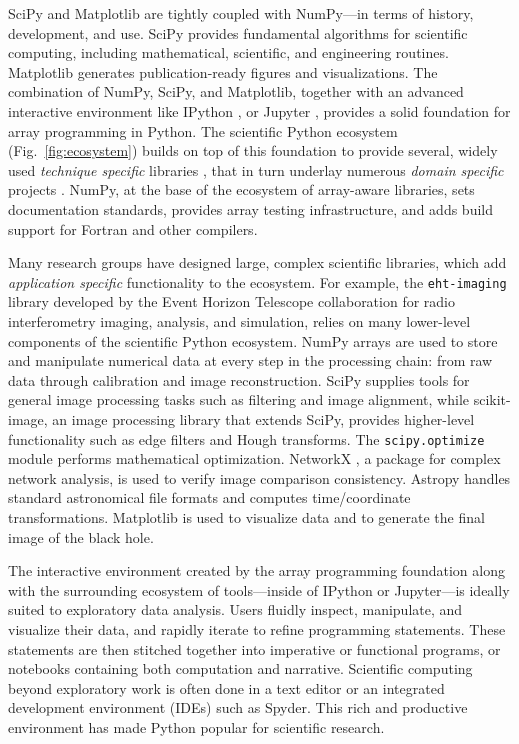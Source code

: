 \documentclass[twocolumn]{article}
\begin{document}
SciPy and Matplotlib are tightly coupled with NumPy---in terms of
history, development, and use.
SciPy provides fundamental algorithms for scientific computing,
including mathematical, scientific, and engineering routines.
Matplotlib generates publication-ready figures and visualizations.
The combination of NumPy, SciPy, and Matplotlib, together with
an advanced interactive environment like IPython \cite{perez2007ipython},
or Jupyter \cite{Kluyver:2016aa}, provides a solid foundation for array
programming in Python.
The scientific Python ecosystem (Fig.~\ref{fig:ecosystem}) builds on top of
this foundation to provide several, widely used \emph{technique specific}
libraries \cite{pedregosa2011scikit,vanderwalt2014scikit,SciPyProceedings_11},
that in turn underlay numerous \emph{domain specific} projects
\cite{astropy:2013,astropy:2018,cock2009biopython,millman2007analysis,sunpy2015,2018EGUGA..2012146H}.
NumPy, at the base of the ecosystem of array-aware libraries,
sets documentation standards, provides array testing infrastructure,
and adds build support for Fortran and other compilers.

Many research groups have designed large,
complex scientific libraries, which add \emph{application specific} functionality
to the ecosystem.
For example, the \texttt{eht-imaging} library \cite{chael2019ehtim} developed by
the Event Horizon Telescope collaboration for radio interferometry imaging,
analysis, and simulation, relies on many lower-level components of the scientific Python
ecosystem.
NumPy arrays are used to store and manipulate numerical data at every step
in the processing chain: from raw data through calibration and image
reconstruction.
SciPy supplies tools for general image processing tasks such as
filtering and image alignment, while scikit-image, an image processing
library that extends SciPy, provides higher-level functionality such as
edge filters and Hough transforms.
The \texttt{scipy.optimize} module performs mathematical optimization.
NetworkX \cite{SciPyProceedings_11}, a package for complex
network analysis, is used to verify image comparison consistency.
Astropy \cite{astropy:2013, astropy:2018} handles standard
astronomical file formats and computes time/coordinate transformations.
Matplotlib is used to visualize data and to generate the final image of the black hole.

The interactive environment created by the array programming
foundation along with the surrounding ecosystem of tools---inside of
IPython or Jupyter---is ideally suited to exploratory data analysis.
Users fluidly inspect, manipulate, and visualize their data, and
rapidly iterate to refine programming statements. These statements are
then stitched together into imperative or functional programs, or
notebooks containing both computation and narrative.
Scientific computing beyond exploratory work is often done in a text editor
or an integrated development environment (IDEs) such as Spyder.
This rich and productive environment has made Python popular
for scientific research.
\end{document}
